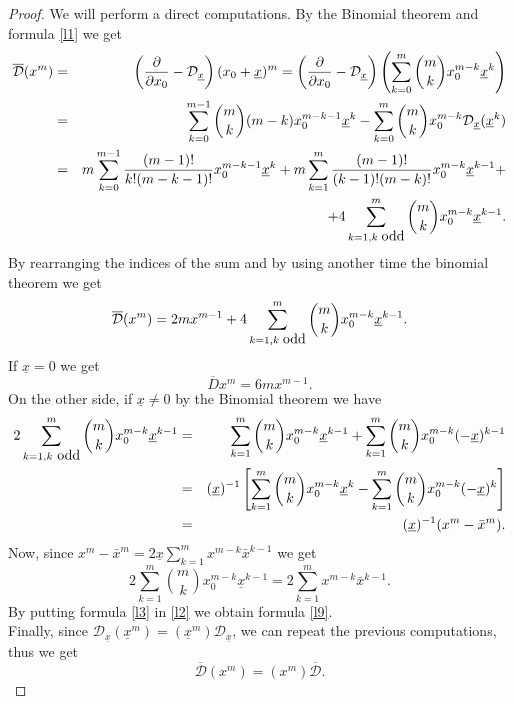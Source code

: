\documentclass[reqno,11pt]{amsart}
\numberwithin{equation}{section}
\theoremstyle{definition}
\begin{document}
\begin{proof}
We will perform a direct computations. By the Binomial theorem and formula \eqref{l1} we get
\begin{eqnarray*}
\mathcal{\overline{D}}(x^m)&=& \left(\frac{\partial}{\partial x_0}- \mathcal{D}_{\underline{x}}\right) (x_0+ \underline{x})^m=\left(\frac{\partial}{\partial x_0}- \mathcal{D}_{\underline{x}}\right) \left( \sum_{k=0}^m \binom{m}{k} x_{0}^{m-k} \underline{x}^k\right)\\
&=& \sum_{k=0}^{m-1} \binom{m}{k} (m-k) x_{0}^{m-k-1} \underline{x}^{k}- \sum_{k=0}^m \binom{m}{k}x_{0}^{m-k} \mathcal{D}_{\underline{x}} (\underline{x}^k)\\
&=& m \sum_{k=0}^{m-1} \frac{(m-1)!}{k!(m-k-1)!} x_{0}^{m-k-1} \underline{x}^{k}+m \sum_{k=1}^{m} \frac{(m-1)!}{(k-1)!(m-k)!} x_{0}^{m-k} \underline{x}^{k-1}+\\
&& + 4\sum_{k=1, k \, \, \hbox{odd}}^m \binom{m}{k} x_{0}^{m-k} \underline{x}^{k-1}.
\end{eqnarray*}
By rearranging the indices of the sum and by using another time the binomial theorem we get
\begin{equation}
\label{l2}
\mathcal{\overline{D}}(x^m)=2mx^{m-1}+ 4\sum_{k=1, k \, \, \hbox{odd}}^m \binom{m}{k} x_{0}^{m-k} \underline{x}^{k-1}.
\end{equation}
If $ \underline{x} =0$ we get
$$ \overline{D}x^m=6mx^{m-1}.$$
On the other side, if $ \underline{x} \neq 0$ by the Binomial theorem we have
\begin{eqnarray*}
2 \sum_{k=1, k \hbox{ odd}}^m \binom{m}{k} x_{0}^{m-k} \underline{x}^{k-1}&=& \sum_{k=1}^m \binom{m}{k} x_{0}^{m-k} \underline{x}^{k-1}+ \sum_{k=1}^m \binom{m}{k} x_{0}^{m-k} (-\underline{x})^{k-1}\\
&=& (\underline{x})^{-1} \left[ \sum_{k=1}^m \binom{m}{k} x_{0}^{m-k} \underline{x}^k - \sum_{k=1}^{m} \binom{m}{k} x_{0}^{m-k} (-\underline{x})^{k}\right]\\
&=& (\underline{x})^{-1}(x^m- \bar{x}^m).
\end{eqnarray*}
Now, since $x^{m}- \bar{x}^m=2 \underline{x} \sum_{k=1}^m x^{m-k} \bar{x}^{k-1}$ we get
\begin{equation}
\label{l3}
2 \sum_{k=1}^m \binom{m}{k} x_{0}^{m-k} \underline{x}^{k-1}= 2 \sum_{k=1}^m x^{m-k} \bar{x}^{k-1}.
\end{equation}
By putting formula \eqref{l3} in \eqref{l2} we obtain formula \eqref{l9}.
\\ Finally, since $ \mathcal{D}_{\underline{x}}(\underline{x}^m)=(\underline{x}^m)\mathcal{D}_{\underline{x}}$, we can repeat the previous computations, thus we get
$$ \mathcal{\overline{D}}(x^m)=(x^m) \mathcal{\overline{D}}.$$
\end{proof}
\end{document}

